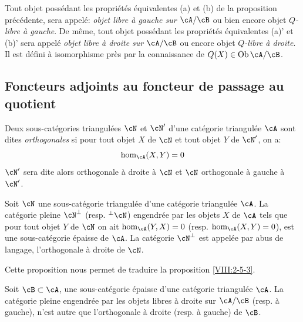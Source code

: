 \begin{definition}\label{VIII:2-5-4}
Tout objet possédant les propriétés équivalentes (a) et (b) de la 
proposition précédente, sera appelé: \emph{objet libre à gauche sur 
$\cA/\cB$} ou bien encore objet \emph{$Q$-libre à gauche}. De même, tout 
objet possédant les propriétés équivalentes (a)' et (b)' sera appelé 
\emph{objet libre à droite sur $\cA/\cB$} ou encore objet 
\emph{$Q$-libre à droite}. Il est défini à isomorphisme près par la 
connaissance de $Q(X)\in\operatorname{Ob}{\cA/\cB}$. 
\end{definition}





\subsection{Foncteurs adjoints au foncteur de passage au quotient}\label{VIII:2-6}





\begin{definition}\label{VIII:2-6-1}
Deux sous-catégories triangulées $\cN$ et $\cN'$ d'une catégorie 
triangulée $\cA$ sont dites \emph{orthogonales} si pour tout objet $X$ de 
$\cN$ et tout objet $Y$ de $\cN'$, on a: 
\[
  \hom_\cA(X,Y) = 0 
\]
$\cN'$ sera dite alors orthogonale à droite à $\cN$ et $\cN$ orthogonale 
à gauche à $\cN'$. 
\end{definition}





\begin{proposition}\label{VIII:2-6-2}
Soit $\cN$ une sous-catégorie triangulée d'une catégorie triangulée 
$\cA$. La catégorie pleine $\cN^\bot$ (resp. $^\bot\cN$) engendrée par les 
objets $X$ de $\cA$ tels que pour tout objet $Y$ de $\cN$ on ait 
$\hom_\cA(Y,X)=0$ (resp. $\hom_\cA(X,Y)=0$), est une sous-catégorie épaisse 
de $\cA$. La catégorie $\cN^\bot$ est appelée par abus de langage, 
l'orthogonale à droite de $\cN$. 
\end{proposition}

Cette proposition nous permet de traduire la proposition \ref{VIII:2-5-3}. 





\begin{proposition}\label{VIII:2-6-3}
Soit $\cB\subset\cA$, une sous-catégorie épaisse d'une catégorie 
triangulée $\cA$. La catégorie pleine engendrée par les objets libres à 
droite sur $\cA/\cB$ (resp. à gauche), n'est autre que l'orthogonale à 
droite (resp. à gauche) de $\cB$. 
\end{proposition}





